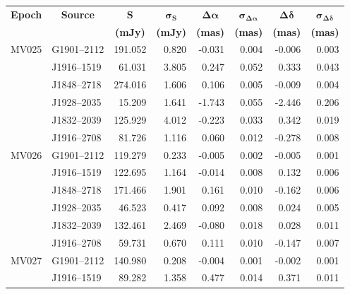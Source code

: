 \begin{table}[h]
    \footnotesize
    \centering
    \onehalfspacing
	\begin{tabular}{llrrrrrr} 
	\toprule
	\multicolumn{1}{c}{\bf Epoch} &
	\multicolumn{1}{c}{\bf Source} & 
	\multicolumn{1}{c}{ $\boldsymbol{S}$} & 
	\multicolumn{1}{c}{ $\boldsymbol{\sigma_S}$} & 
	\multicolumn{1}{c}{ $\boldsymbol{\Delta\alpha}$ } &
	\multicolumn{1}{c}{ $\boldsymbol{\sigma_{\Delta\alpha}}$ } & 
	\multicolumn{1}{c}{ $\boldsymbol{\Delta\delta}$ } &
	\multicolumn{1}{c}{ $\boldsymbol{\sigma_{\Delta\delta}}$ } \\
	\multicolumn{1}{c}{} & 
	\multicolumn{1}{c}{} & 
	\multicolumn{1}{c}{ \textbf{(mJy)} }&
	\multicolumn{1}{c}{ \textbf{(mJy)} }&
	\multicolumn{1}{c}{ \textbf{(mas)} }&
	\multicolumn{1}{c}{ \textbf{(mas)} }&
	\multicolumn{1}{c}{ \textbf{(mas)} }&
	\multicolumn{1}{c}{ \textbf{(mas)} }\\
	\midrule
MV025 & G1901--2112  &  191.052  &  0.820  & -0.031  &  0.004  & -0.006  & 0.003  \\
	  & J1916--1519  &   61.031  &  3.805  &  0.247  &  0.052  &  0.333  & 0.043  \\
	  & J1848--2718  &  274.016  &  1.606  &  0.106  &  0.005  & -0.009  & 0.004  \\
	  & J1928--2035  &   15.209  &  1.641  & -1.743  &  0.055  & -2.446  & 0.206  \\
 	  & J1832--2039  &  125.929  &  4.012  & -0.223  &  0.033  &  0.342  & 0.019  \\
	  & J1916--2708  &   81.726  &  1.116  &  0.060  &  0.012  & -0.278  & 0.008  \\ \hline
MV026 & G1901--2112  &  119.279  &  0.233  & -0.005  &  0.002  & -0.005  & 0.001  \\
	  & J1916--1519  &  122.695  &  1.164  & -0.014  &  0.008  &  0.132  & 0.006  \\
	  & J1848--2718  &  171.466  &  1.901  &  0.161  &  0.010  & -0.162  & 0.006  \\
	  & J1928--2035  &   46.523  &  0.417  &  0.092  &  0.008  &  0.024  & 0.005  \\
	  & J1832--2039  &  132.461  &  2.469  & -0.080  &  0.018  &  0.028  & 0.011  \\
	  & J1916--2708  &   59.731  &  0.670  &  0.111  &  0.010  & -0.147  & 0.007  \\ \hline
MV027 & G1901--2112  &  140.980  &  0.208  & -0.004  &  0.001  & -0.002  & 0.001  \\
	  & J1916--1519  &   89.282  &  1.358  &  0.477  &  0.014  &  0.371  & 0.011  \\

\end{tabular}
\end{table}
